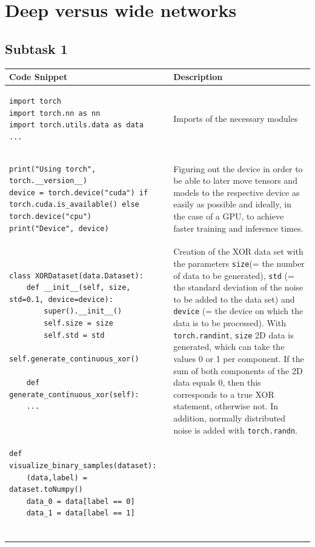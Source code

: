 \section{Deep versus wide networks}

\subsection*{Subtask 1}

\footnotesize
\begin{longtable}{|m{}|m{}|} \hline
\textbf{Code Snippet} & \textbf{Description} \\ \hline
\begin{lstlisting}
import torch
import torch.nn as nn
import torch.utils.data as data
...
\end{lstlisting} & Imports of the necessary modules\\ \hline
\begin{lstlisting}
print("Using torch", torch.__version__)
device = torch.device("cuda") if torch.cuda.is_available() else torch.device("cpu")
print("Device", device)
\end{lstlisting} & Figuring out the device in order to be able to later move tensors and models to the respective device as easily as possible and ideally, in the case of a GPU, to achieve faster training and inference times. \\ \hline
\begin{lstlisting}
class XORDataset(data.Dataset):
    def __init__(self, size, std=0.1, device=device):
        super().__init__()
        self.size = size
        self.std = std
        self.generate_continuous_xor()

    def generate_continuous_xor(self):
    ...
\end{lstlisting} & Creation of the XOR data set with the parameters \lstinline|size|(= the number of data to be generated), \lstinline|std| (= the standard deviation of the noise to be added to the data set) and \lstinline|device| (= the device on which the data is to be processed). With \lstinline|torch.randint|, \lstinline|size| 2D data is generated, which can take the values 0 or 1 per component. If the sum of both components of the 2D data equals 0, then this corresponds to a true XOR statement, otherwise not. In addition, normally distributed noise is added with \lstinline|torch.randn|.  \\ \hline
\begin{lstlisting}
def visualize_binary_samples(dataset):
    (data,label) = dataset.toNumpy()
    data_0 = data[label == 0]
    data_1 = data[label == 1]


\end{lstlisting}
\end{longtable}
